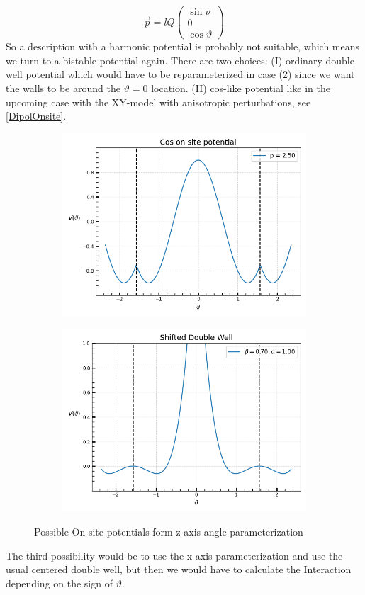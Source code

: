 	\begin{equation}
		\vec{p} =	lQ\left( \begin{array}{c}
			\sin \vartheta \\
			0 \\
			\cos \vartheta
		\end{array} \right)
	\end{equation}
	So a description with a harmonic potential is probably not suitable, which means we turn to a bistable potential again. There are two choices: (I) ordinary double well potential which would have to be reparameterized in case (2) since we want the walls to be around the $\vartheta =	0$ location. (II) cos-like potential like in the upcoming case with the XY-model with anisotropic perturbations, see \autoref{DipolOnsite}.
	\begin{figure}[htp]
		\begin{subfigure}{0.5\textwidth}
			\includegraphics[width=0.8 \linewidth]{graphics/CosOnSite.png}
		\end{subfigure}
		\begin{subfigure}{0.5\textwidth}
			\includegraphics[width=0.8 \linewidth]{graphics/ShiftedDoubleWell.png}
		\end{subfigure}
		\caption{Possible On site potentials form z-axis angle parameterization}
		\label{DipolOnsite}
	\end{figure}
	The third possibility would be to use the x-axis parameterization and use the usual centered double well, but then we would have to calculate the Interaction depending on the sign of $\vartheta$.
	
